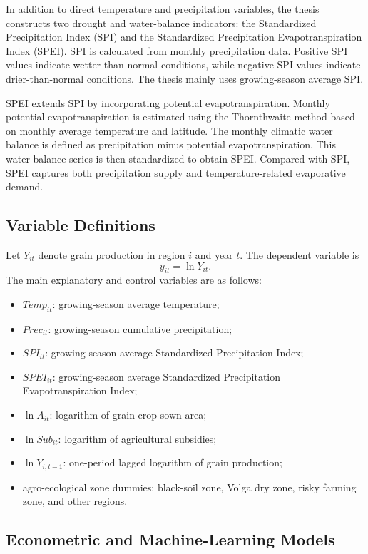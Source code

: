 \documentclass[12pt,a4paper]{article}
\begin{document}
In addition to direct temperature and precipitation variables, the thesis constructs two drought and water-balance indicators: the Standardized Precipitation Index (SPI) and the Standardized Precipitation Evapotranspiration Index (SPEI). SPI is calculated from monthly precipitation data. Positive SPI values indicate wetter-than-normal conditions, while negative SPI values indicate drier-than-normal conditions. The thesis mainly uses growing-season average SPI.

SPEI extends SPI by incorporating potential evapotranspiration. Monthly potential evapotranspiration is estimated using the Thornthwaite method based on monthly average temperature and latitude. The monthly climatic water balance is defined as precipitation minus potential evapotranspiration. This water-balance series is then standardized to obtain SPEI. Compared with SPI, SPEI captures both precipitation supply and temperature-related evaporative demand.

\subsection{Variable Definitions}

Let \(Y_{it}\) denote grain production in region \(i\) and year \(t\). The dependent variable is
\[
y_{it}=\ln Y_{it}.
\]
The main explanatory and control variables are as follows:

\begin{itemize}
    \item \(Temp_{it}\): growing-season average temperature;
    \item \(Prec_{it}\): growing-season cumulative precipitation;
    \item \(SPI_{it}\): growing-season average Standardized Precipitation Index;
    \item \(SPEI_{it}\): growing-season average Standardized Precipitation Evapotranspiration Index;
    \item \(\ln A_{it}\): logarithm of grain crop sown area;
    \item \(\ln Sub_{it}\): logarithm of agricultural subsidies;
    \item \(\ln Y_{i,t-1}\): one-period lagged logarithm of grain production;
    \item agro-ecological zone dummies: black-soil zone, Volga dry zone, risky farming zone, and other regions.
\end{itemize}

\subsection{Econometric and Machine-Learning Models}
\end{document}
